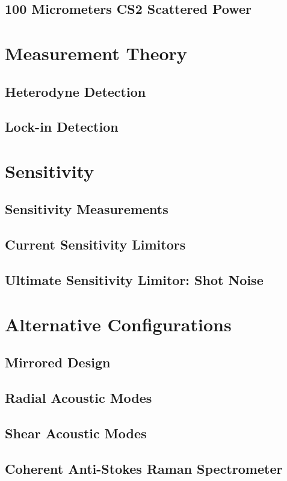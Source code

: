 \documentclass[%
  reprint,
  superscriptaddress,
  amsmath,amssymb,
  aps,
  prapplied,
]{revtex4-2}
\begin{document}
\subsection{100 Micrometers CS2 Scattered Power}

\section{Measurement Theory}
\subsection{Heterodyne Detection}
\subsection{Lock-in Detection}

\section{Sensitivity}
\subsection{Sensitivity Measurements}
\subsection{Current Sensitivity Limitors}
\subsection{Ultimate Sensitivity Limitor: Shot Noise}

\section{Alternative Configurations}
\subsection{Mirrored Design}
\subsection{Radial Acoustic Modes}
\subsection{Shear Acoustic Modes}
\subsection{Coherent Anti-Stokes Raman Spectrometer}

\twocolumngrid

\end{document}
